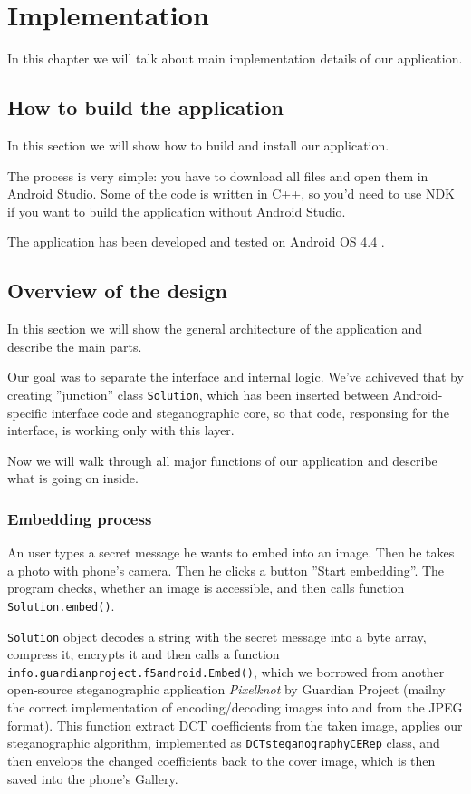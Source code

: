 \chapter{Implementation}

In this chapter we will talk about main implementation details of
our application.

\section{How to build the application}
In this section we will show how to build and install our application.

The process is very simple: you have to download all files and open them
in Android Studio. Some of the code is written in C++, so you'd need to 
use NDK if you want to build the application without Android Studio.

The application has been developed and tested on Android OS 4.4 .

\section{Overview of the design}
In this section we will show the general architecture of the application
and describe the main parts.

Our goal was to separate the interface and internal logic. We've achiveved that
by creating ''junction'' class \texttt{Solution}, which has been inserted between
Android-specific interface code and steganographic core, so that code, responsing for
the interface, is working only with this layer.

Now we will walk through all major functions of our application and describe what is going on inside.

\subsection{Embedding process}

An user types a secret message he wants to embed into an image. Then he takes a photo with 
phone's camera. Then he clicks a button ''Start embedding''. The program checks, whether 
an image is accessible, and then calls function \texttt{Solution.embed()}.

\texttt{Solution} object decodes a string with the secret message into a byte array,
compress it, encrypts it and then calls a function \texttt{info.guardianproject.f5android.Embed()},
which we borrowed from another open-source steganographic application \emph{Pixelknot} by Guardian
Project (mailny the correct implementation of encoding/decoding images into and from the JPEG format). 
This function extract DCT coefficients from the taken image,  applies our steganographic
algorithm, implemented as \texttt{DCTsteganographyCERep} class, and then envelops the changed coefficients
back to the cover image, which is then saved into the phone's Gallery.

